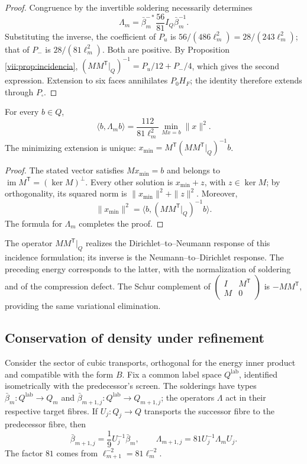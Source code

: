 \begin{proof}
Congruence by the invertible soldering necessarily determines
\[
 \Lambda_m=\bar\beta_m^{-*}\frac{56}{81}I_Q\bar\beta_m^{-1}.
\]
Substituting the inverse, the coefficient of \(P_u\) is
\(56/(486\ell_m^2)=28/(243\ell_m^2)\); that of \(P_-\) is
\(28/(81\ell_m^2)\). Both are positive. By
Proposition \ref{vii:prop:incidencia},
\((MM^{\mathsf T}|_Q)^{-1}=P_u/12+P_-/4\),
which gives the second expression. Extension to six faces annihilates
\(P_0H_F\); the identity therefore extends through \(P_\square\).
\end{proof}

\begin{proposition}
\label{vii:prop:minima-extension}
For every \(b\in Q\),
\[
 \langle b,\Lambda_m b\rangle
 =\frac{112}{81\ell_m^2}
   \min_{Mx=b}\|x\|^2.
\]
The minimizing extension is unique:
\(x_{\min}=M^{\mathsf T}(MM^{\mathsf T}|_Q)^{-1}b\).
\end{proposition}

\begin{proof}
The stated vector satisfies \(Mx_{\min}=b\) and belongs to
\(\operatorname{im}M^{\mathsf T}=(\ker M)^\perp\).
Every other solution is \(x_{\min}+z\), with \(z\in\ker M\); by
orthogonality, its squared norm is \(\|x_{\min}\|^2+\|z\|^2\).
Moreover,
\[
 \|x_{\min}\|^2
 =\langle b,(MM^{\mathsf T}|_Q)^{-1}b\rangle.
\]
The formula for \(\Lambda_m\) completes the proof.
\end{proof}

The operator \(MM^{\mathsf T}|_Q\) realizes the Dirichlet--to--Neumann
response of this incidence formulation; its inverse
is the Neumann--to--Dirichlet response. The preceding energy corresponds
to the latter, with the normalization of soldering and of the compression
defect. The Schur complement of
\(\left(\begin{smallmatrix}I&M^{\mathsf T}\\M&0\end{smallmatrix}\right)\)
is \(-MM^{\mathsf T}\), providing the same variational elimination.

\subsection{Conservation of density under refinement}
\label{vii:sec:densidad-refinamiento}

Consider the sector of cubic transports, orthogonal for the energy
inner product and compatible with the form \(B\). Fix a
common label space \(Q^{\mathrm{lab}}\), identified
isometrically with the predecessor's screen. The solderings have
types
\(\bar\beta_m:Q^{\mathrm{lab}}\longrightarrow Q_m\) and
\(\bar\beta_{m+1,j}:Q^{\mathrm{lab}}\longrightarrow Q_{m+1,j}\);
the operators \(\Lambda\) act in their respective target fibres.
If
\(U_j:Q_j\longrightarrow Q\) transports the successor fibre to the predecessor fibre,
then
\[
 \bar\beta_{m+1,j}=\frac19U_j^{-1}\bar\beta_m,\qquad
 \Lambda_{m+1,j}=81U_j^{-1}\Lambda_mU_j.
\]
The factor \(81\) comes from \(\ell_{m+1}^{-2}=81\ell_m^{-2}\).

